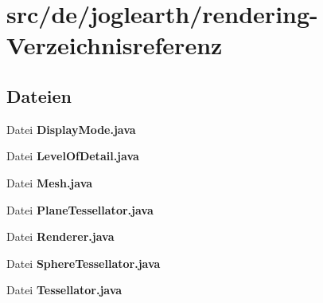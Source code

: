 \section{src/de/joglearth/rendering-\/\-Verzeichnisreferenz}
\label{dir_b48a4702eb517647b443a10198eacf53}
\subsection*{Dateien}
\begin{DoxyCompactItemize}
\item 
Datei {\bfseries Display\-Mode.\-java}
\item 
Datei {\bfseries Level\-Of\-Detail.\-java}
\item 
Datei {\bfseries Mesh.\-java}
\item 
Datei {\bfseries Plane\-Tessellator.\-java}
\item 
Datei {\bfseries Renderer.\-java}
\item 
Datei {\bfseries Sphere\-Tessellator.\-java}
\item 
Datei {\bfseries Tessellator.\-java}
\end{DoxyCompactItemize}
